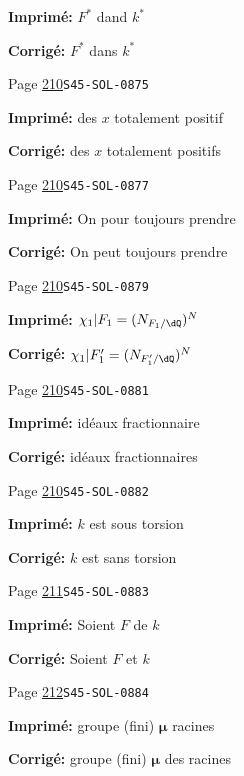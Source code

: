 \documentclass[oneside]{book}
\newcommand{\dmu}{{\bm\mu}}
\theoremstyle{sga-source}
\theoremstyle{sga-source-dash}
\theoremstyle{sga-source-dotdash}
\theoremstyle{sga-source-number-note-dash}
\theoremstyle{sga-source-note-number-dotdash}
\theoremstyle{sga-source-example-dotdash}
\theoremstyle{sga-source-inline-number}
\theoremstyle{sga-source-bare-number}
\theoremstyle{sga-source}
\begin{document}
\begin{description}
\par\noindent\textbf{Imprimé:} $F^\ast$ dand $k^\ast$
\par\noindent\textbf{Corrigé:} $F^\ast$ dans $k^\ast$
\smallskip
\item[\hypertarget{apparatus:FR-0212}{212}] Page \hyperlink{printpage:fr:210}{210}\quad\texttt{S45-SOL-0875}
\par\noindent\textbf{Imprimé:} des $x$ totalement positif
\par\noindent\textbf{Corrigé:} des $x$ totalement positifs
\smallskip
\item[\hypertarget{apparatus:FR-0213}{213}] Page \hyperlink{printpage:fr:210}{210}\quad\texttt{S45-SOL-0877}
\par\noindent\textbf{Imprimé:} On pour toujours prendre
\par\noindent\textbf{Corrigé:} On peut toujours prendre
\smallskip
\item[\hypertarget{apparatus:FR-0214}{214}] Page \hyperlink{printpage:fr:210}{210}\quad\texttt{S45-SOL-0879}
\par\noindent\textbf{Imprimé:} \(\chi_1|F_1=(N_{F_1/\dQ})^N\)
\par\noindent\textbf{Corrigé:} \(\chi_1|F_1'=(N_{F_1'/\dQ})^N\)
\smallskip
\item[\hypertarget{apparatus:FR-0215}{215}] Page \hyperlink{printpage:fr:210}{210}\quad\texttt{S45-SOL-0881}
\par\noindent\textbf{Imprimé:} idéaux fractionnaire
\par\noindent\textbf{Corrigé:} idéaux fractionnaires
\smallskip
\item[\hypertarget{apparatus:FR-0216}{216}] Page \hyperlink{printpage:fr:210}{210}\quad\texttt{S45-SOL-0882}
\par\noindent\textbf{Imprimé:} $k$ est sous torsion
\par\noindent\textbf{Corrigé:} $k$ est sans torsion
\smallskip
\item[\hypertarget{apparatus:FR-0217}{217}] Page \hyperlink{printpage:fr:211}{211}\quad\texttt{S45-SOL-0883}
\par\noindent\textbf{Imprimé:} Soient $F$ de $k$
\par\noindent\textbf{Corrigé:} Soient $F$ et $k$
\smallskip
\item[\hypertarget{apparatus:FR-0218}{218}] Page \hyperlink{printpage:fr:212}{212}\quad\texttt{S45-SOL-0884}
\par\noindent\textbf{Imprimé:} groupe (fini) $\dmu$ racines
\par\noindent\textbf{Corrigé:} groupe (fini) $\dmu$ des racines

\end{description}
\end{document}
